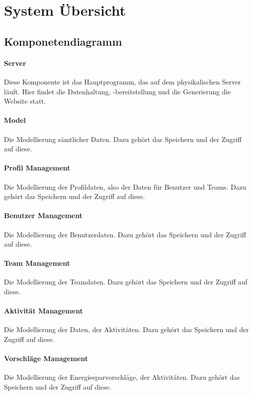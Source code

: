 ﻿\section{System \"Ubersicht}

\subsection{Komponetendiagramm}

\paragraph{Server} Diese Komponente ist das Hauptprogramm, das auf dem physikalischen Server läuft. Hier findet die Datenhaltung, -bereitstellung und die Generierung die Website statt.

\paragraph{Model} Die Modellierung sämtlicher Daten. Dazu gehört das Speichern und der Zugriff auf diese.

\paragraph{Profil Management} Die Modellierung der Profildaten, also der Daten für Benutzer und Teams. Dazu gehört das Speichern und der Zugriff auf diese.

\paragraph{Benutzer Management} Die Modellierung der Benutzerdaten. Dazu gehört das Speichern und der Zugriff auf diese.

\paragraph{Team Management} Die Modellierung der Teamdaten. Dazu gehört das Speichern und der Zugriff auf diese.

\paragraph{Aktivität Management} Die Modellierung der Daten, der Aktivitäten. Dazu gehört das Speichern und der Zugriff auf diese.

\paragraph{Vorschläge Management}  Die Modellierung der Energiesparvorschläge, der Aktivitäten. Dazu gehört das Speichern und der Zugriff auf diese.

